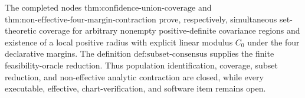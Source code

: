 The completed nodes \(\text{thm:confidence-union-coverage}\) and \(\text{thm:non-effective-four-margin-contraction}\) prove, respectively, simultaneous set-theoretic coverage for arbitrary nonempty positive-definite covariance regions and existence of a local positive radius with explicit linear modulus \(C_0\) under the four declarative margins. The definition \(\text{def:subset-consensus}\) supplies the finite feasibility-oracle reduction. Thus population identification, coverage, subset reduction, and non-effective analytic contraction are closed, while every executable, effective, chart-verification, and software item remains open.